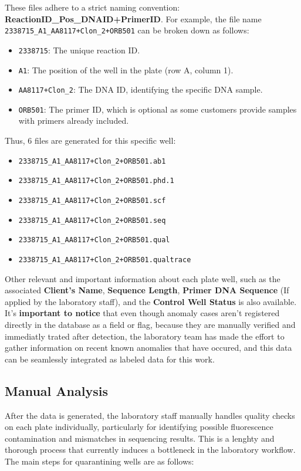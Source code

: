 These files adhere to a strict naming convention: \textbf{ReactionID\_Pos\_DNAID+PrimerID}. 
For example, the file name \texttt{2338715\_A1\_AA8117+Clon\_2+ORB501} can be broken down as follows:
\begin{itemize}
  \item \texttt{2338715}: The unique reaction ID.
  \item \texttt{A1}: The position of the well in the plate (row A, column 1).
  \item \texttt{AA8117+Clon\_2}: The DNA ID, identifying the specific DNA sample.
  \item \texttt{ORB501}: The primer ID, which is optional as some customers provide samples with primers already included.
\end{itemize}
Thus, 6 files are generated for this specific well: 
\begin{itemize}
  \item \texttt{2338715\_A1\_AA8117+Clon\_2+ORB501.ab1}
  \item \texttt{2338715\_A1\_AA8117+Clon\_2+ORB501.phd.1}
  \item \texttt{2338715\_A1\_AA8117+Clon\_2+ORB501.scf}
  \item \texttt{2338715\_A1\_AA8117+Clon\_2+ORB501.seq}
  \item \texttt{2338715\_A1\_AA8117+Clon\_2+ORB501.qual}
  \item \texttt{2338715\_A1\_AA8117+Clon\_2+ORB501.qualtrace}
\end{itemize}

Other relevant and important information about each plate well, such as the associated \textbf{Client's Name}, \textbf{Sequence Length}, \textbf{Primer DNA Sequence} (If applied by the laboratory staff), and the \textbf{Control Well Status} is also available.  
\newline
It's \textbf{important to notice} that even though anomaly cases aren't registered directly in the database as a field or flag, because they are manually verified and immediatly trated after detection, the laboratory team has made the effort to gather information on recent known anomalies that have occured, and this data can be seamlessly integrated as labeled data for this work.
\subsection{Manual Analysis}

After the data is generated, the laboratory staff manually handles quality checks on each plate individually, particularly for identifying possible fluorescence contamination and mismatches in sequencing results. This is a lenghty and thorough process that currently induces a bottleneck in the laboratory workflow. The main steps for quarantining wells are as follows:


